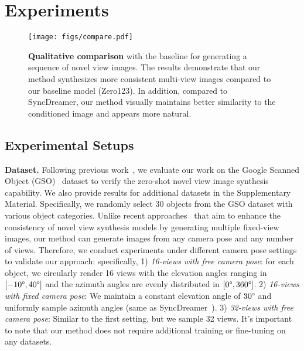 \section{Experiments}
\label{sec:experiments}

\begin{figure*}[t]
\vspace{-6mm}
    \centering
    \texttt{[image: figs/compare.pdf]}
    \vspace{-4mm}
    \caption{\textbf{Qualitative comparison} with the baseline for generating a sequence of novel view images.  
    The results demonstrate that our method synthesizes more consistent multi-view images compared to our baseline model (Zero123). In addition, compared to SyncDreamer, our method visually maintains better similarity to the conditioned image and appears more natural.}
    \label{fig:sota_compare}
\vspace{-5mm}
\end{figure*}

\subsection{Experimental Setups}
\textbf{Dataset.}
Following previous work~\cite{zero123, SyncDreamer}, we evaluate our work on the Google Scanned Object (GSO)~\cite{GSO} dataset to verify the zero-shot novel view image synthesis capability. 
We also provide results for additional datasets in the Supplementary Material.
Specifically, we randomly select 30 objects from the GSO dataset with various object categories. 
Unlike recent approaches~\cite{mvdream, SyncDreamer} that aim to enhance the consistency of novel view synthesis models by generating multiple fixed-view images, our method can generate images from any camera pose and any number of views. Therefore, we conduct experiments under different camera pose settings to validate our approach:
specifically, 
1) \textit{16-views with free camera pose}: for each object, we circularly render 16 views with the elevation angles ranging in $[-10\degree, 40\degree]$ and the azimuth angles are evenly distributed in $[0\degree, 360\degree]$. 
2) \textit{16-views with fixed camera pose}: We maintain a constant elevation angle of $30\degree$ and uniformly sample azimuth angles (same as SyncDreamer~\cite{SyncDreamer}).
3) \textit{32-views with free camera pose}: Similar to the first setting, but we sample 32 views.
It's important to note that our method does not require additional training or fine-tuning on any datasets.

